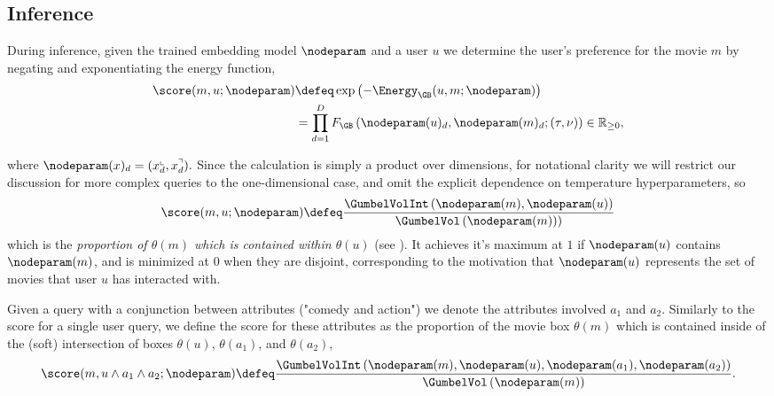 \subsection{Inference}
\label{sec:inference}
During inference, given the trained embedding model $\nodeparam$ and a user $u$ we determine the user's preference for the movie $m$ by negating and exponentiating the energy function,
\begin{align*}
\score(m,u; \nodeparam) &\defeq \exp\left(-\Energy_\GB(u,m;\nodeparam)\right) \nonumber \\
&= \prod_{d=1}^D F_\GB\left(\nodeparam(u)_d, \nodeparam(m)_d; (\tau, \nu)\right) \in \mathbb{R}_{\geq 0},
\end{align*}

{where $\nodeparam(x)_d = (x_d^\llcorner, x_d^\urcorner).$} Since the calculation is simply a product over dimensions, for notational clarity we will restrict our discussion for more complex queries to the one-dimensional case, and omit the explicit dependence on temperature hyperparameters, so
\[\score(m,u; \nodeparam) \defeq\frac{\GumbelVolInt\left(\nodeparam(m),\nodeparam(u)\right)} {\GumbelVol\left(\nodeparam(m))\right)}\]
which is the \emph{proportion of $\theta(m)$ which is contained within $\theta(u)$} (see ). It achieves it's maximum at $1$ if $\nodeparam(u)$ contains $\nodeparam(m)$, and is minimized at $0$ when they are disjoint, corresponding to the motivation that $\nodeparam(u)$ represents the set of movies that user $u$ has interacted with.

Given a query with a conjunction between attributes (\eg "comedy and action") we denote the attributes involved $a_1$ and $a_2$.
Similarly to the score for a single user query, we define the score for these attributes as the proportion of the movie box $\theta(m)$ which is contained inside of the (soft) intersection of boxes $\theta(u)$, $\theta(a_1)$, and $\theta(a_2)$, \ie
\small
\[
\score(m,u\wedge a_1 \wedge a_2; \nodeparam) \defeq
\frac{\GumbelVolInt\left(\nodeparam(m),\nodeparam(u), \nodeparam(a_1), \nodeparam(a_2)\right)}
{\GumbelVol\left(\nodeparam(m)\right)}.
\]
\normalsize

